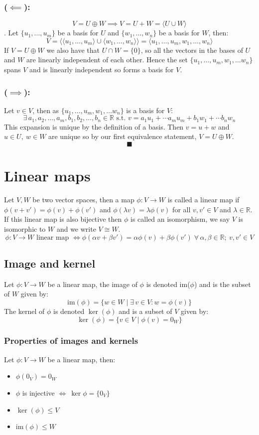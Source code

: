 \documentclass[12pt]{article}
\newcommand{\arbreal}[2]{{#1}_1,{#1}_2,\dots,{#1}_{#2}}
\newcommand{\st}{\text{ s.t. }}
\begin{document}
\subsubsection*{(\(\impliedby\)):}
\[V=U\oplus W\implies V=U+W=\langle U\cup W\rangle\].
Let \(\{u_1,\dots,u_m\}\) be a basis for \(U\) and \(\{w_1,\dots,w_n\}\) be a basis for \(W\), then:
\[V=\langle \langle u_1,\dots ,u_m\rangle \cup \langle w_1,\dots,w_n\rangle\rangle=\langle u_1,\dots,u_m,w_1,\dots,w_n\rangle\]
If \(V=U\oplus W\) we also have that \(U\cap W=\{0\}\), so all the vectors in the bases of \(U\) and \(W\) are linearly independent of each other. Hence the set \(\{u_1,\dots,u_m,w_1,\dots w_n\}\) spans \(V\) and is linearly independent so forms a basis for \(V\).
\subsubsection*{(\(\implies\)):}
Let \(v\in V\), then as \(\{u_1,\dots,u_m,w_1,\dots w_n\}\) is a basis for \(V\):
\[\exists\,\arbreal{a}{m},\arbreal{b}{n}\in\mathbb{R}\st v=a_1u_1+\cdots a_mu_m+b_1w_1+\cdots b_nw_n\]
This expansion is unique by the definition of a basis. Then \(v=u+w\) and \(u\in U,\ w\in W\) are unique so by our first equivalence statement, \(V=U\oplus W\).
\[\blacksquare\]
\section{Linear maps}
Let \(V,W\) be two vector spaces, then a map \(\phi:V\to W\) is called a linear map if \(\phi(v+v')=\phi(v)+\phi(v')\) and \(\phi(\lambda v)=\lambda \phi(v)\) for all \(v,v'\in V\) and \(\lambda\in \mathbb{R}\). If this linear map is also bijective then \(\phi\) is called an isomorphism, we say \(V\) is isomorphic to \(W\) and we write \(V\cong W\).
\[\phi:V\to W\text{ linear map }\iff \phi(\alpha v+\beta v')=\alpha\phi(v)+\beta\phi(v')\;  \forall\, \alpha,\beta\in \mathbb{R};\ v,v'\in V\]
\subsection*{Image and kernel}
Let \(\phi:V\to W\) be a linear map, the image of \(\phi\) is denoted im(\(\phi\)) and is the subset of \(W\) given by:
\[\text{im}(\phi)=\{w\in W\mid \exists\, v\in V: w=\phi(v)\}\]
The kernel of \(\phi\) is denoted \(\ker(\phi)\) and is a subset of \(V\) given by:
\[\ker{(\phi)}=\{v\in V\mid \phi(v)=0_W\}\]
\subsubsection*{Properties of images and kernels}
Let \(\phi:V\to W\) be a linear map, then:
\begin{itemize}
    \item \(\phi(0_V)=0_W\)
    \item \(\phi\) is injective \(\iff\ \ker{\phi}=\{0_V\}\) 
    \item \(\ker(\phi)\leqslant V\)
    \item im\((\phi)\leqslant W\)
\end{itemize}
\end{document}

